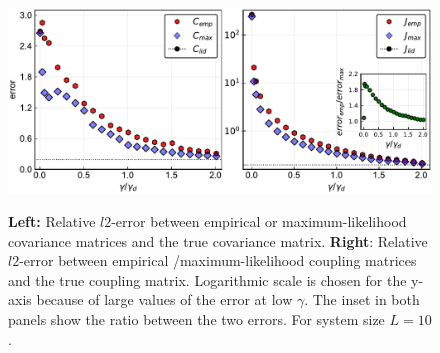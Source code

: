 \documentclass[preprint,amsmath,amssymb,superscriptaddress,showpacs,pre]{revtex4-1}
\providecommand{\DIFadd}[1]{{\protect\color{blue}\uwave{#1}}} %
\providecommand{\DIFdel}[1]{{\protect\color{red}\sout{#1}}}                      %
\providecommand{\DIFaddFL}[1]{\DIFadd{#1}} %
\providecommand{\DIFdelFL}[1]{\DIFdel{#1}} %
\providecommand{\DIFaddbeginFL}{} %
\providecommand{\DIFaddendFL}{} %
\providecommand{\DIFdelbeginFL}{} %
\providecommand{\DIFdelendFL}{} %
\newcommand{\DIFscaledelfig}{0.5}
\newlength{\DIFdelgraphicswidth} %
\newlength{\DIFdelgraphicsheight} %
\newcommand{\DIFaddincludegraphics}[2][]{{\color{blue}\fbox{\DIFOincludegraphics[#1]{#2}}}} %
\newcommand{\DIFdelincludegraphics}[2][]{%
\sbox{\DIFdelgraphicsbox}{\DIFOincludegraphics[#1]{#2}}%
\settoboxwidth{\DIFdelgraphicswidth}{\DIFdelgraphicsbox} %
\settoboxtotalheight{\DIFdelgraphicsheight}{\DIFdelgraphicsbox} %
\scalebox{\DIFscaledelfig}{%
\parbox[b]{\DIFdelgraphicswidth}{\usebox{\DIFdelgraphicsbox}\\[-\baselineskip] \rule{\DIFdelgraphicswidth}{0em}}\llap{\resizebox{\DIFdelgraphicswidth}{\DIFdelgraphicsheight}{%
\setlength{\unitlength}{\DIFdelgraphicswidth}%
\begin{picture}(1,1)%
\thicklines\linethickness{2pt} %
{\color[rgb]{1,0,0}\put(0,0){\framebox(1,1){}}}%
{\color[rgb]{1,0,0}\put(0,0){\line( 1,1){1}}}%
{\color[rgb]{1,0,0}\put(0,1){\line(1,-1){1}}}%
\end{picture}%
}\hspace*{3pt}}} %
} %
\DeclareRobustCommand{\DIFaddbeginFL}{\DIFOaddbeginFL \let\includegraphics\DIFaddincludegraphics} %
\DeclareRobustCommand{\DIFaddendFL}{\DIFOaddendFL \let\includegraphics\DIFOincludegraphics} %
\DeclareRobustCommand{\DIFdelbeginFL}{\DIFOdelbeginFL \let\includegraphics\DIFdelincludegraphics} %
\DeclareRobustCommand{\DIFdelendFL}{\DIFOaddendFL \let\includegraphics\DIFOincludegraphics} %
\begin{document}
 \begin{figure}[!htb]
 	\DIFdelbeginFL %
\DIFdelFL{\hspace{1mm}
 }%
\DIFdelendFL %
 			\centering\DIFdelbeginFL %
\DIFdelendFL \DIFaddbeginFL \includegraphics[keepaspectratio=true,width=1.0\textwidth]{Figures/epsilon_error_L10_balanced_tree_100.pdf}
 		\DIFaddFL{\hspace{1mm}
 	}\DIFaddendFL \caption{\textbf{Left:} Relative $l2$-error between empirical or maximum-likelihood covariance matrices and the true covariance matrix. \textbf{Right}: Relative $l2$-error between empirical /maximum-likelihood coupling matrices and the true coupling matrix. Logarithmic scale is chosen for the y-axis because of large values of the error at low $\gamma$. The inset in both panels show the ratio between the two errors. For system size $L=10$.}
 	\label{fig:error_1_L10}
 \end{figure}
\end{document}
